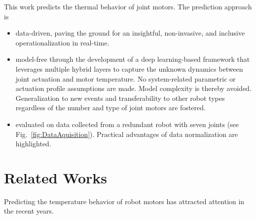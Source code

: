 \documentclass{ifacconf}
\begin{document}
This work predicts  the thermal behavior of joint motors. The prediction approach is
\begin{itemize}
	\item data-driven, paving the ground for an  insightful, non-invasive, and inclusive operationalization in real-time. %
	\item model-free through the development of a deep learning-based framework that leverages multiple hybrid layers to capture the unknown dynamics between joint actuation and motor temperature. No system-related parametric or actuation profile assumptions are made. Model complexity is thereby avoided.  Generalization to new events and transferability to other robot types {regardless of the number and type of joint motors are fostered.}
	\item evaluated on data collected from a redundant robot with seven joints (see Fig.~\ref{fig:DataAquisition}). Practical advantages of data normalization are highlighted.
\end{itemize}




\section{Related Works}
\label{chap:relatedworks}
Predicting the temperature behavior of robot motors has attracted attention in the recent years. %
\end{document}
